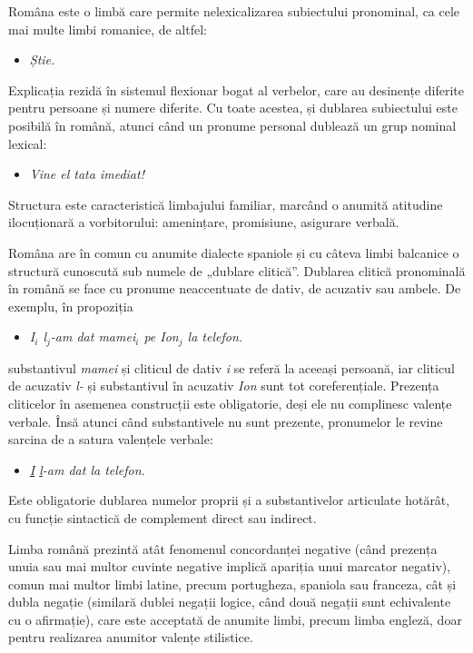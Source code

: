 \begin{multicols}{2}
Româna este o limbă care permite nelexicalizarea subiectului pronominal, ca cele mai multe limbi romanice, de altfel: 

\begin{itemize}
\item \textit{Știe.}
\end{itemize}

Explicația rezidă în sistemul flexionar bogat al verbelor, care au desinențe diferite pentru persoane și numere diferite.
Cu toate acestea, și dublarea subiectului este posibilă în română, atunci când un pronume personal dublează un grup nominal lexical:

\begin{itemize}
\item\textit{Vine el tata imediat!}
\end{itemize}

Structura este caracteristică limbajului familiar, marcând o anumită atitudine ilocuționară a vorbitorului: amenințare, promisiune, asigurare verbală.

Româna are în comun cu anumite dialecte spaniole și cu câteva limbi balcanice o structură cunoscută sub numele de „dublare clitică”. Dublarea clitică pronominală în română se face cu pronume neaccentuate de dativ, de acuzativ sau ambele. De exemplu, în propoziția 

\begin{itemize}
\item\textit{I$_{i}$ l$_{j}$-am dat mamei$_{i}$ pe Ion$_{j}$ la telefon.}
\end{itemize}

substantivul \textit{mamei} și cliticul de dativ \textit{i} se referă la aceeași persoană, iar cliticul de acuzativ \textit{l-} și substantivul în acuzativ \textit{Ion} sunt tot coreferențiale. Prezența cliticelor în asemenea construcții este obligatorie, deși ele nu complinesc valențe verbale. Însă atunci când substantivele nu sunt prezente, pronumelor le revine sarcina de a satura valențele verbale:

\begin{itemize}
\item\textit{\underline{I} \underline{l}-am dat la telefon.}
\end{itemize}

Este obligatorie dublarea numelor proprii și a substantivelor articulate hotărât, cu funcție sintactică de complement direct sau indirect. 

Limba română prezintă atât fenomenul concordanței negative (când prezența unuia sau mai multor cuvinte negative implică apariția unui marcator negativ), comun mai multor limbi latine, precum portugheza, spaniola sau franceza, cât și dubla negație (similară dublei negații logice, când două negații sunt echivalente cu o afirmație), care este acceptată de anumite limbi, precum limba engleză, doar pentru realizarea anumitor valențe stilistice. 


\end{multicols}
